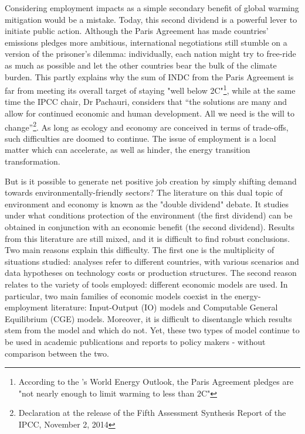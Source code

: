 Considering employment impacts as a simple secondary benefit of global warming mitigation would be a mistake. Today, this second dividend is a powerful lever to initiate public action. Although the Paris Agreement has made countries' emissions pledges more ambitious, international negotiations still stumble on a version of the prisoner's dilemma: individually, each nation might try to free-ride as much as possible and let the other countries bear the bulk of the climate burden. This partly explains why the sum of INDC from the Paris Agreement is far from meeting its overall target of staying "well below 2\degree C"\footnote{According to the \citet{OECD/IEA2016}'s World Energy Outlook, the Paris Agreement pledges are "not nearly enough to limit warming to less than 2\degree C"}, while at the same time the IPCC chair, Dr Pachauri, considers that “the solutions are many and allow for continued economic and human development. All we need is the will to change”\footnote{Declaration at the release of the Fifth Assessment Synthesis Report of the IPCC, November 2, 2014}.
As long as ecology and economy are conceived in terms of trade-offs, such difficulties are doomed to continue. The issue of employment is a local matter which can accelerate, as well as hinder, the energy transition transformation. 

But is it possible to generate net positive job creation by simply shifting demand towards environmentally-friendly sectors? 
The literature on this dual topic of environment and economy is known as the "double dividend" debate. It studies under what conditions protection of the environment (the first dividend) can be obtained in conjunction with an economic benefit (the second dividend).
Results from this literature are still mixed, and it is difficult to find robust conclusions. Two main reasons explain this difficulty. The first one is the multiplicity of situations studied: analyses refer to different countries, with various scenarios and data hypotheses on technology costs or production structures. The second reason relates to the variety of tools employed: different economic models are used. In particular, two main families of economic models coexist in the energy-employment literature: Input-Output (IO) models and Computable General Equilibrium (CGE) models. Moreover, it is difficult to disentangle which results stem from the model and which do not. Yet, these two types of model continue to be used in academic publications and reports to policy makers - without comparison between the two.

